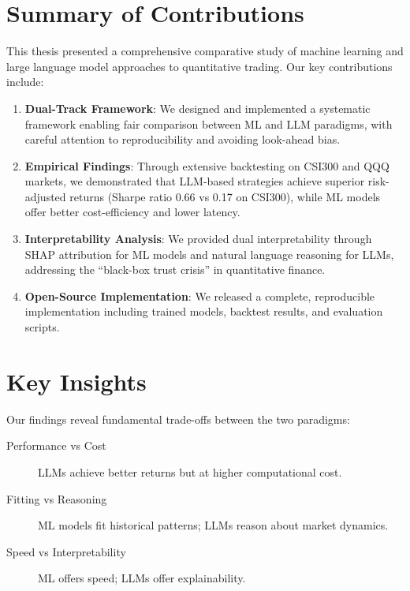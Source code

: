 
\section{Summary of Contributions}

This thesis presented a comprehensive comparative study of machine learning and large language model approaches to quantitative trading. Our key contributions include:

\begin{enumerate}
    \item \textbf{Dual-Track Framework}: We designed and implemented a systematic framework enabling fair comparison between ML and LLM paradigms, with careful attention to reproducibility and avoiding look-ahead bias.

    \item \textbf{Empirical Findings}: Through extensive backtesting on CSI300 and QQQ markets, we demonstrated that LLM-based strategies achieve superior risk-adjusted returns (Sharpe ratio 0.66 vs 0.17 on CSI300), while ML models offer better cost-efficiency and lower latency.

    \item \textbf{Interpretability Analysis}: We provided dual interpretability through SHAP attribution for ML models and natural language reasoning for LLMs, addressing the ``black-box trust crisis'' in quantitative finance.

    \item \textbf{Open-Source Implementation}: We released a complete, reproducible implementation including trained models, backtest results, and evaluation scripts.
\end{enumerate}

\section{Key Insights}

Our findings reveal fundamental trade-offs between the two paradigms:

\begin{description}
    \item[Performance vs Cost] LLMs achieve better returns but at higher computational cost.
    \item[Fitting vs Reasoning] ML models fit historical patterns; LLMs reason about market dynamics.
    \item[Speed vs Interpretability] ML offers speed; LLMs offer explainability.
\end{description}

